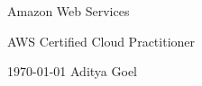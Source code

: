 \documentclass[11pt, a4paper]{awesome-cv} %
\begin{document}
\begin{cventries}

  \cventry
  {}
  {Amazon Web Services} {} {}
  {
    \begin{cvitems}
        \item AWS Certified Cloud Practitioner
    \end{cvitems}}
\end{cventries}























\makecvfooter
  {\today}
  {Aditya Goel}
  {\thepage}


% 
% 
% 
% 
% 
% 
% 
% 


\end{document}
